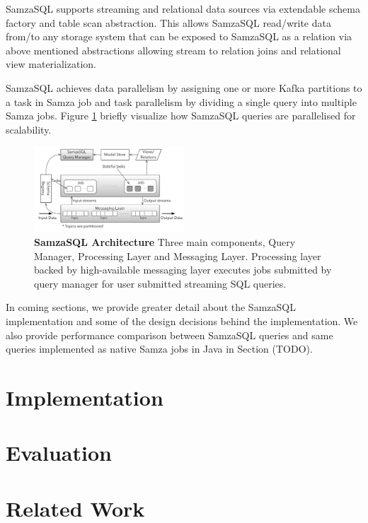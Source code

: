 \documentclass[10pt, conference, compsocconf]{IEEEtran}
\begin{document}
SamzaSQL supports streaming and relational data sources via extendable schema factory and table scan abstraction. This allows SamzaSQL read/write data from/to any storage system that can be exposed to SamzaSQL as a relation via above mentioned abstractions allowing stream to relation joins and relational view materialization.

SamzaSQL achieves data parallelism by assigning one or more Kafka partitions to a task in Samza job and task parallelism by dividing a single query into multiple Samza jobs. Figure \ref{fig:parallelism} briefly visualize how SamzaSQL queries are parallelised for scalability.

\begin{figure}[h!]
  \centering
  \includegraphics[width=0.5\textwidth]{samzasql-arch}
  \caption{\textbf{SamzaSQL Architecture} Three main components, Query Manager, Processing Layer and Messaging Layer. Processing layer backed by high-available messaging layer executes jobs submitted by query manager for user submitted streaming SQL queries.}
  \label{fig:parallelism}
\end{figure}

In coming sections, we provide greater detail about the SamzaSQL implementation and some of the design decisions behind the implementation. We also provide performance comparison between SamzaSQL queries and same queries implemented as native Samza jobs in Java in Section (TODO).



\section{Implementation}

\section{Evaluation}

\section{Related Work}
\end{document}
